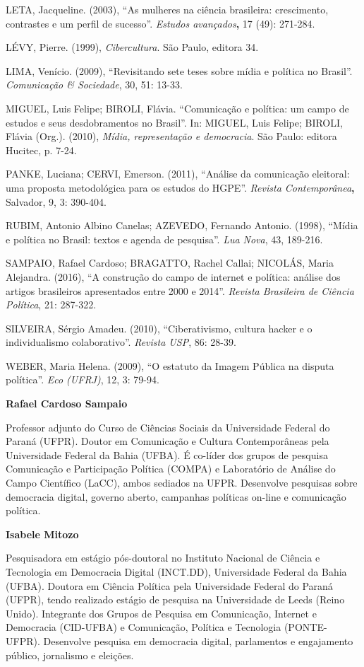 LETA, Jacqueline. (2003), ``As mulheres na ciência brasileira:
crescimento, contrastes e um perfil de sucesso''. \emph{Estudos
avançados}\textbf{,} 17 (49): 271-284.

LÉVY, Pierre. (1999), \emph{Cibercultura}. São Paulo, editora 34.

LIMA, Venício. (2009), ``Revisitando sete teses sobre mídia e política
no Brasil''. \emph{Comunicação \& Sociedade}, 30, 51: 13-33.

MIGUEL, Luis Felipe; BIROLI, Flávia. ``Comunicação e política: um campo
de estudos e seus desdobramentos no Brasil''. In: MIGUEL, Luis Felipe;
BIROLI, Flávia (Org.). (2010), \emph{Mídia, representação e democracia}.
São Paulo: editora Hucitec, p. 7-24.

PANKE, Luciana; CERVI, Emerson. (2011), ``Análise da comunicação
eleitoral: uma proposta metodológica para os estudos do HGPE''.
\emph{Revista Contemporânea}\textbf{,} Salvador, 9, 3: 390-404.

RUBIM, Antonio Albino Canelas; AZEVEDO, Fernando Antonio. (1998),
``Mídia e política no Brasil: textos e agenda de pesquisa''. \emph{Lua
Nova}, 43, 189-216.

SAMPAIO, Rafael Cardoso; BRAGATTO, Rachel Callai; NICOLÁS, Maria
Alejandra. (2016), ``A construção do campo de internet e política:
análise dos artigos brasileiros apresentados entre 2000 e 2014''.
\emph{Revista Brasileira de Ciência Política}, 21: 287-322.

SILVEIRA, Sérgio Amadeu. (2010), ``Ciberativismo, cultura hacker e o
individualismo colaborativo''. \emph{Revista USP}, 86: 28-39.

WEBER, Maria Helena. (2009), ``O estatuto da Imagem Pública na disputa
política''. \emph{Eco (UFRJ)}, 12, 3: 79-94.

\textbf{Rafael Cardoso Sampaio}

Professor adjunto do Curso de Ciências Sociais da Universidade Federal
do Paraná (UFPR). Doutor em Comunicação e Cultura Contemporâneas pela
Universidade Federal da Bahia (UFBA). É co-líder dos grupos de pesquisa
Comunicação e Participação Política (COMPA) e Laboratório de Análise do
Campo Científico (LaCC), ambos sediados na UFPR. Desenvolve pesquisas
sobre democracia digital, governo aberto, campanhas políticas on-line e
comunicação política.

\textbf{Isabele Mitozo}

Pesquisadora em estágio pós-doutoral no Instituto Nacional de Ciência e
Tecnologia em Democracia Digital (INCT.DD), Universidade Federal da
Bahia (UFBA). Doutora em Ciência Política pela Universidade Federal do
Paraná (UFPR), tendo realizado estágio de pesquisa na Universidade de
Leeds (Reino Unido). Integrante dos Grupos de Pesquisa em Comunicação,
Internet e Democracia (CID-UFBA) e Comunicação, Política e Tecnologia
(PONTE-UFPR). Desenvolve pesquisa em democracia digital, parlamentos e
engajamento público, jornalismo e eleições.

